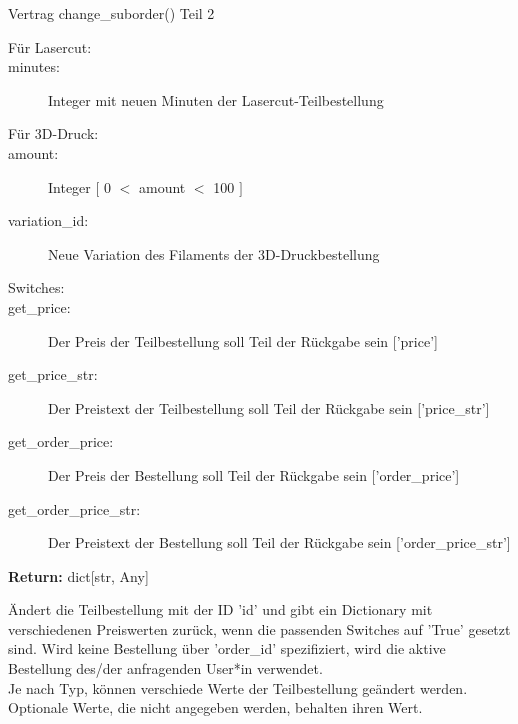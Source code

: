 \documentclass[12pt]{article}
\newcommand{\insetContract}{12pt}
\newcommand{\insetMethodDescription}{-0.7cm}
\begin{document}
\begin{contract}{Vertrag change_suborder() Teil 2} 
    \begin{description}
        \item[Für Lasercut:]
        \item[\hspace{\insetContract} minutes:] Integer mit neuen Minuten der Lasercut-Teilbestellung
        \item[Für 3D-Druck:]
        \item[\hspace{\insetContract} amount:]  Integer $[$ 0 $<$ amount $<$ 100 $]$
        \item[\hspace{\insetContract} variation_id:] Neue Variation des Filaments der 3D-Druckbestellung
        \item[Switches:]
        \item[\hspace{\insetContract} get_price:] Der Preis der Teilbestellung soll Teil der Rückgabe sein ['price']
        \item[\hspace{\insetContract} get_price_str:] Der Preistext der Teilbestellung soll Teil der Rückgabe sein ['price_str']
        \item[\hspace{\insetContract} get_order_price:] Der Preis der Bestellung soll Teil der Rückgabe sein ['order_price']
        \item[\hspace{\insetContract} get_order_price_str:] Der Preistext der Bestellung soll Teil der Rückgabe sein ['order_price_str']
    \end{description}
    \textbf{Return:} dict[str, Any]
\end{contract}
\hspace{\insetMethodDescription{}}
Ändert die Teilbestellung mit der ID 'id' und gibt ein Dictionary mit verschiedenen Preiswerten zurück, wenn die passenden Switches auf 'True' gesetzt sind.
Wird keine Bestellung über 'order_id' spezifiziert, wird die aktive Bestellung des/der anfragenden User*in verwendet. \\
Je nach Typ, können verschiede Werte der Teilbestellung geändert werden. Optionale Werte, die nicht angegeben werden, behalten ihren Wert.
\end{document}
